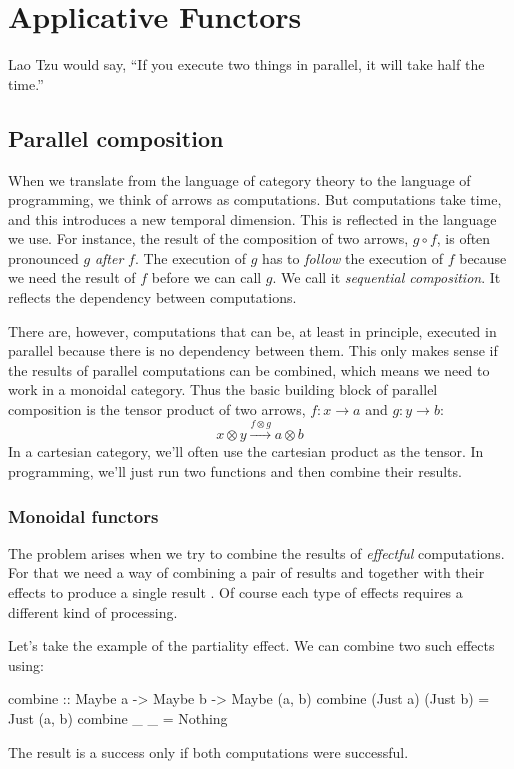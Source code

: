 \documentclass[DaoFP]{subfiles}
\begin{document}
\setcounter{chapter}{13}

\chapter{Applicative Functors}

Lao Tzu would say, ``If you execute two things in parallel, it will take half the time.''

\section{Parallel composition}

When we translate from the language of category theory to the language of programming, we think of arrows as computations. But computations take time, and this introduces a new temporal dimension. This is reflected in the language we use. For instance, the result of the composition of two arrows, $g \circ f$, is often pronounced  $g$ \emph{after} $f$. The execution of $g$ has to \emph{follow} the execution of $f$ because we need the result of $f$ before we can call $g$. We call it \emph{sequential composition}. It reflects the dependency between computations.

There are, however, computations that can be, at least in principle, executed in parallel because there is no dependency between them. This only makes sense if the results of parallel computations can be combined, which means we need to work in a monoidal category. Thus the basic building block of parallel composition is the tensor product of two arrows, $f \colon x \to a$ and $g \colon y \to b$:
\[ x \otimes y \xrightarrow{f \otimes g} a \otimes b \]
In a cartesian category, we'll often use the cartesian product as the tensor. In programming, we'll just run two functions and then combine their results.

\subsection{Monoidal functors}

The problem arises when we try to combine the results of \emph{effectful} computations. For that we need a way of combining a pair of results  and  together with their effects to produce a single result . Of course each type of effects requires a different kind of processing.

Let's take the example of the partiality effect. We can combine two such effects using:
\begin{haskell}
combine :: Maybe a -> Maybe b -> Maybe (a, b)
combine (Just a) (Just b) = Just (a, b)
combine _ _ = Nothing
\end{haskell}
The result is a success only if both computations were successful. 
\end{document}
